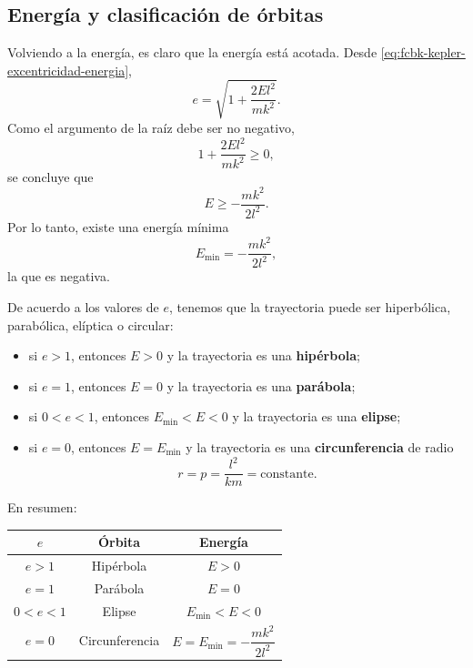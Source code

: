 \documentclass[../apunte_mecanica_clasica.tex]{subfiles}%
\begin{document}
\subsection{Energía y clasificación de órbitas}

Volviendo a la energía, es claro que la energía está acotada. Desde \eqref{eq:fcbk-kepler-excentricidad-energia},
\begin{equation}
    e=\sqrt{1+\frac{2El^2}{mk^2}}.
    \label{eq:fcbk-e-raiz-energia}
\end{equation}
Como el argumento de la raíz debe ser no negativo,
\begin{equation}
    1+\frac{2El^2}{mk^2}\geq 0,
    \label{eq:fcbk-condicion-raiz-e}
\end{equation}
se concluye que
\begin{equation}
    E\geq -\frac{mk^2}{2l^2}.
    \label{eq:fcbk-cota-energia}
\end{equation}
Por lo tanto, existe una energía mínima
\begin{equation}
    E_{\min}=-\frac{mk^2}{2l^2},
    \label{eq:fcbk-energia-minima}
\end{equation}
la que es negativa.

De acuerdo a los valores de $e$, tenemos que la trayectoria puede ser hiperbólica, parabólica, elíptica o circular:
\begin{itemize}
    \item si $e>1$, entonces $E>0$ y la trayectoria es una \textbf{hipérbola};
    \item si $e=1$, entonces $E=0$ y la trayectoria es una \textbf{parábola};
    \item si $0<e<1$, entonces $E_{\min}<E<0$ y la trayectoria es una \textbf{elipse};
    \item si $e=0$, entonces $E=E_{\min}$ y la trayectoria es una \textbf{circunferencia} de radio
    \begin{equation}
        r=p=\frac{l^2}{km}=\text{constante}.
        \label{eq:fcbk-radio-circular}
    \end{equation}
\end{itemize}

En resumen:
\begin{center}
\begin{tabular}{c c c}
\hline
$e$ & Órbita & Energía \\
\hline
$e>1$ & Hipérbola & $E>0$ \\
$e=1$ & Parábola & $E=0$ \\
$0<e<1$ & Elipse & $E_{\min}<E<0$ \\
$e=0$ & Circunferencia & $E=E_{\min}=-\dfrac{mk^2}{2l^2}$ \\
\hline
\end{tabular}
\end{center}
\end{document}
